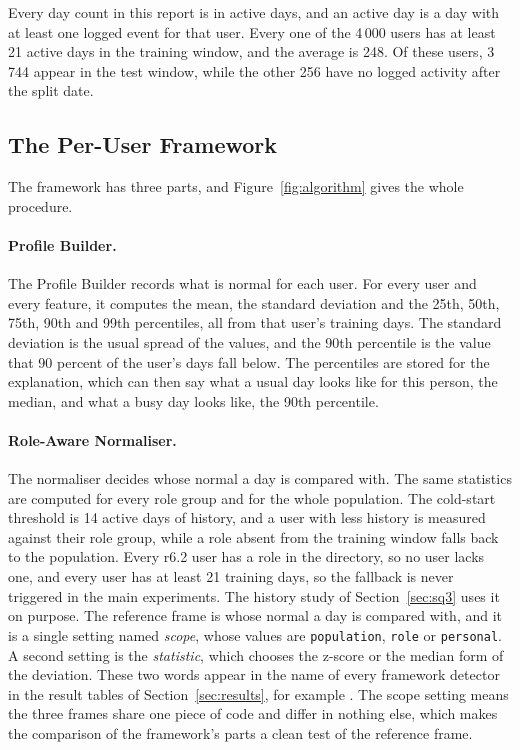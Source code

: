 \documentclass[a4paper,12pt]{article}
\begin{document}
Every day count in this report is in active days, and an active day is a day with at least one logged event for that user. Every one of the 4\,000 users has at least 21 active days in the training window, and the average is 248. Of these users, 3\,744 appear in the test window, while the other 256 have no logged activity after the split date.

\subsection{The Per-User Framework}
\label{sec:framework}
The framework has three parts, and Figure~\ref{fig:algorithm} gives the whole procedure.

\paragraph{Profile Builder.} The Profile Builder records what is normal for each user. For every user and every feature, it computes the mean, the standard deviation and the 25th, 50th, 75th, 90th and 99th percentiles, all from that user's training days. The standard deviation is the usual spread of the values, and the 90th percentile is the value that 90 percent of the user's days fall below. The percentiles are stored for the explanation, which can then say what a usual day looks like for this person, the median, and what a busy day looks like, the 90th percentile.

\paragraph{Role-Aware Normaliser.} The normaliser decides whose normal a day is compared with. The same statistics are computed for every role group and for the whole population. The cold-start threshold is 14 active days of history, and a user with less history is measured against their role group, while a role absent from the training window falls back to the population. Every r6.2 user has a role in the directory, so no user lacks one, and every user has at least 21 training days, so the fallback is never triggered in the main experiments. The history study of Section~\ref{sec:sq3} uses it on purpose. The reference frame is whose normal a day is compared with, and it is a single setting named \emph{scope}, whose values are \texttt{population}, \texttt{role} or \texttt{personal}. A second setting is the \emph{statistic}, which chooses the z-score or the median form of the deviation. These two words appear in the name of every framework detector in the result tables of Section~\ref{sec:results}, for example . The scope setting means the three frames share one piece of code and differ in nothing else, which makes the comparison of the framework's parts a clean test of the reference frame.
\end{document}
